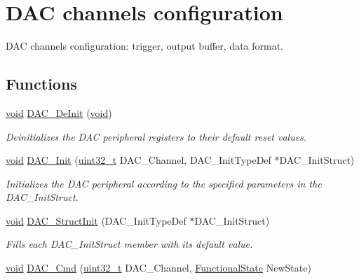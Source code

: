 \hypertarget{group___d_a_c___group1}{\section{D\-A\-C channels configuration}
\label{group___d_a_c___group1}
}


D\-A\-C channels configuration\-: trigger, output buffer, data format.  


\subsection*{Functions}
\begin{DoxyCompactItemize}
\item 
\hyperlink{group___n_a_m_e_ga18028b8badbf1ea7e704ccac3c488e82}{void} \hyperlink{group___d_a_c___group1_ga1fae225204e1e049d6795319e99ba8bc}{D\-A\-C\-\_\-\-De\-Init} (\hyperlink{group___n_a_m_e_ga18028b8badbf1ea7e704ccac3c488e82}{void})
\begin{DoxyCompactList}\small\item\em Deinitializes the D\-A\-C peripheral registers to their default reset values. \end{DoxyCompactList}\item 
\hyperlink{group___n_a_m_e_ga18028b8badbf1ea7e704ccac3c488e82}{void} \hyperlink{group___d_a_c___group1_ga7c59850468ed4bf0659663fe495441da}{D\-A\-C\-\_\-\-Init} (\hyperlink{stdint_8h_a435d1572bf3f880d55459d9805097f62}{uint32\-\_\-t} D\-A\-C\-\_\-\-Channel, D\-A\-C\-\_\-\-Init\-Type\-Def $\ast$D\-A\-C\-\_\-\-Init\-Struct)
\begin{DoxyCompactList}\small\item\em Initializes the D\-A\-C peripheral according to the specified parameters in the D\-A\-C\-\_\-\-Init\-Struct. \end{DoxyCompactList}\item 
\hyperlink{group___n_a_m_e_ga18028b8badbf1ea7e704ccac3c488e82}{void} \hyperlink{group___d_a_c___group1_gadfc270974d54cb5fa5f92556015c4046}{D\-A\-C\-\_\-\-Struct\-Init} (D\-A\-C\-\_\-\-Init\-Type\-Def $\ast$D\-A\-C\-\_\-\-Init\-Struct)
\begin{DoxyCompactList}\small\item\em Fills each D\-A\-C\-\_\-\-Init\-Struct member with its default value. \end{DoxyCompactList}\item 
\hyperlink{group___n_a_m_e_ga18028b8badbf1ea7e704ccac3c488e82}{void} \hyperlink{group___d_a_c___group1_ga323e61530d7fa9396c3bce9edb61f733}{D\-A\-C\-\_\-\-Cmd} (\hyperlink{stdint_8h_a435d1572bf3f880d55459d9805097f62}{uint32\-\_\-t} D\-A\-C\-\_\-\-Channel, \hyperlink{group___exported__types_gac9a7e9a35d2513ec15c3b537aaa4fba1}{Functional\-State} New\-State)

\end{DoxyCompactItemize}
